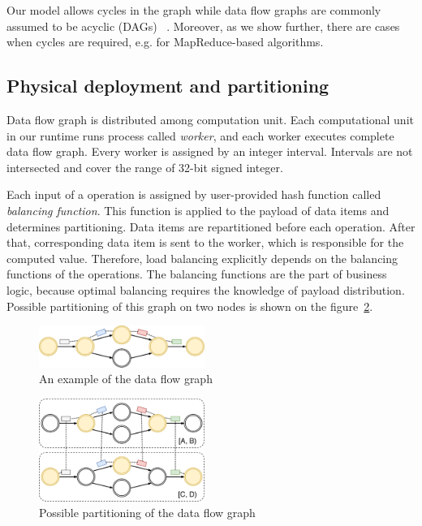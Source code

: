 Our model allows cycles in the graph while data flow graphs are commonly assumed to be acyclic (DAGs) 
~\cite{Zaharia:2016:ASU:3013530.2934664, Carbone:2017:SMA:3137765.3137777}. Moreover, as we show further, there are cases when cycles are required, e.g. for MapReduce-based algorithms. 

\subsection{Physical deployment and partitioning}
Data flow graph is distributed among computation unit. Each computational unit in our runtime runs process called {\it worker}, and each worker executes complete data flow graph. Every worker is assigned by an integer interval. Intervals are not intersected and cover the range of 32-bit signed integer.

Each input of a operation is assigned by user-provided hash function called {\it balancing function}. This function is applied to the payload of data items and determines partitioning. Data items are repartitioned before each operation. After that, corresponding data item is sent to the worker, which is responsible for the computed value. Therefore, load balancing explicitly depends on the balancing functions of the operations. The balancing functions are the part of business logic, because optimal balancing requires the knowledge of payload distribution. Possible partitioning of this graph on two nodes is shown on the figure~\ref{physical-graph-figure}.

\begin{figure}[htbp]
  \centering
  \includegraphics[width=0.48\textwidth]{pics/logical-graph}
  \caption{An example of the data flow graph}
  \label {logical-graph-figure}
\end{figure}

\begin{figure}[htbp]
  \centering
  \includegraphics[width=0.48\textwidth]{pics/physical-graph}
  \caption{Possible partitioning of the data flow graph}
  \label {physical-graph-figure}
\end{figure}

